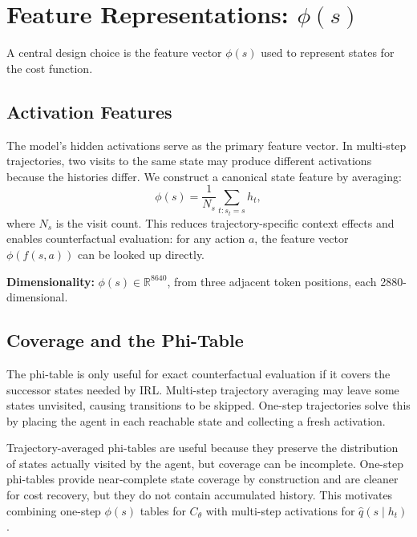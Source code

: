 \documentclass[11pt,a4paper]{article}
\newcommand{\qhat}{\hat q}
\begin{document}
\section{Feature Representations: $\phi(s)$}

A central design choice is the feature vector $\phi(s)$ used to represent states for the cost function.

\subsection{Activation Features}

The model's hidden activations serve as the primary feature vector. In multi-step trajectories, two visits to the same state may produce different activations because the histories differ. We construct a canonical state feature by averaging:
\[
\phi(s)=\frac{1}{N_s}\sum_{t:s_t=s} h_t,
\]
where $N_s$ is the visit count. This reduces trajectory-specific context effects and enables counterfactual evaluation: for any action $a$, the feature vector $\phi(f(s,a))$ can be looked up directly.

\textbf{Dimensionality:} $\phi(s)\in\mathbb{R}^{8640}$, from three adjacent token positions, each 2880-dimensional.

\subsection{Coverage and the Phi-Table}

The phi-table is only useful for exact counterfactual evaluation if it covers the successor states needed by IRL. Multi-step trajectory averaging may leave some states unvisited, causing transitions to be skipped. One-step trajectories solve this by placing the agent in each reachable state and collecting a fresh activation.

\begin{result}
Trajectory-averaged phi-tables are useful because they preserve the distribution of states actually visited by the agent, but coverage can be incomplete. One-step phi-tables provide near-complete state coverage by construction and are cleaner for cost recovery, but they do not contain accumulated history. This motivates combining one-step $\phi(s)$ tables for $C_\theta$ with multi-step activations for $\qhat(s\mid h_t)$.
\end{result}
\end{document}
